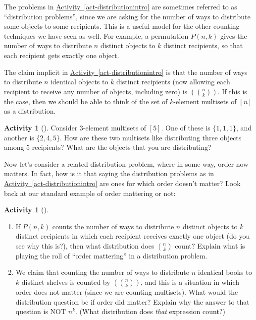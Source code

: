 \documentclass[10pt,]{book}
\theoremstyle{plain}
\theoremstyle{definition}
\theoremstyle{definition}
\theoremstyle{definition}
\newtheorem{activity}[project]{Activity}
\numberwithin{equation}{chapter}
\newcommand{\mchoose}[2]{\left(\!\binom{#1}{#2}\!\right)}
\begin{document}
\hypertarget{p-818}{}%
The problems in \hyperref[act-distributionintro]{Activity~\ref{act-distributionintro}} are sometimes referred to as ``distribution problems'', since we are asking for the number of ways to distribute some objects to some recipients.   This is a useful model for the other counting techniques we have seen as well.  For example, a permutation \(P(n,k)\) gives the number of ways to distribute \(n\) distinct objects to \(k\) distinct recipients, so that each recipient gets exactly one object.%
\par
\hypertarget{p-819}{}%
The claim implicit in \hyperref[act-distributionintro]{Activity~\ref{act-distributionintro}} is that the number of ways to distribute \(n\) identical objects to \(k\) distinct recipients (now allowing each recipient to receive any number of objects, including zero) is \(\mchoose{n}{k}\).  If this is the case, then we should be able to think of the set of \(k\)-element multisets of \([n]\) as a distribution.%
\begin{activity}[]\label{activity-115}
\hypertarget{p-820}{}%
Consider \(3\)-element multisets of \([5]\).  One of these is \(\{1,1,1\}\), and another is \(\{2,4,5\}\).  How are these two multisets like distributing three objects among 5 recipients?  What are the objects that you are distributing?%
\end{activity}
\hypertarget{p-821}{}%
Now let's consider a related distribution problem, where in some way, order now matters.  In fact, how is it that saying the distribution problems as in \hyperref[act-distributionintro]{Activity~\ref{act-distributionintro}} are ones for which order doesn't matter?  Look back at our standard example of order mattering or not:%
\begin{activity}[]\label{activity-116}
\leavevmode%
\begin{enumerate}[font=\bfseries,label=(\alph*),ref=\alph*]
\item\label{task-159} \hypertarget{p-822}{}%
If \(P(n,k)\) counts the number of ways to distribute \(n\) distinct objects to \(k\) distinct recipients in which each recipient receives exactly one object (do you see why this is?), then what distribution does \(\binom{n}{k}\) count?  Explain what is playing the roll of ``order mattering'' in a distribution problem.%
\item\label{task-160} \hypertarget{p-823}{}%
We claim that counting the number of ways to distribute \(n\) identical books to \(k\) distinct shelves is counted by \(\mchoose{n}{k}\), and this is a situation in which order does not matter (since we are counting multisets).  What would the distribution question be if order did matter?  Explain why the answer to that question is NOT \(n^k\). (What distribution does \emph{that} expression count?)%
\end{enumerate}
\end{activity}
\end{document}
